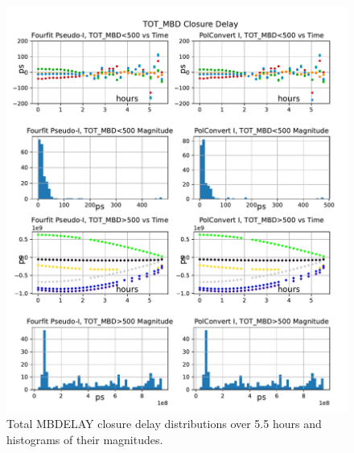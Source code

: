 \documentclass[letterpaper,twoside,12pt]{article}
\begin{document}
\begin{figure}[ht!]
  \begin{center}
  \includegraphics[width=35pc]{TOT_MBD_Closure_Delay.pdf}
  \caption{\small Total MBDELAY closure delay distributions over 5.5 hours and histograms of their magnitudes.}
  \label{tot_mbd}
  \end{center}
\end{figure}
\end{document}
